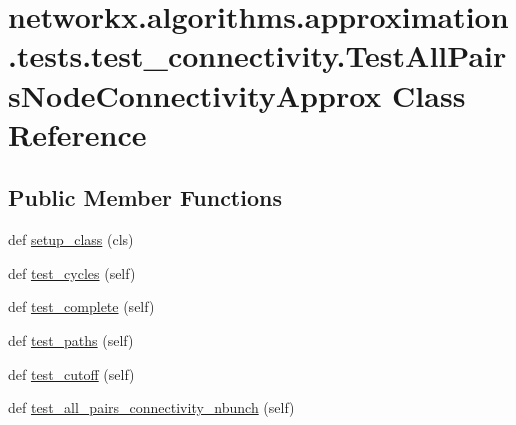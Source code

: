 \hypertarget{classnetworkx_1_1algorithms_1_1approximation_1_1tests_1_1test__connectivity_1_1TestAllPairsNodeConnectivityApprox}{}\section{networkx.\+algorithms.\+approximation.\+tests.\+test\+\_\+connectivity.\+Test\+All\+Pairs\+Node\+Connectivity\+Approx Class Reference}
\label{classnetworkx_1_1algorithms_1_1approximation_1_1tests_1_1test__connectivity_1_1TestAllPairsNodeConnectivityApprox}
\subsection*{Public Member Functions}
\begin{DoxyCompactItemize}
\item 
def \hyperlink{classnetworkx_1_1algorithms_1_1approximation_1_1tests_1_1test__connectivity_1_1TestAllPairsNodeConnectivityApprox_a19a976312e71b914aedfa84754f74647}{setup\+\_\+class} (cls)
\item 
def \hyperlink{classnetworkx_1_1algorithms_1_1approximation_1_1tests_1_1test__connectivity_1_1TestAllPairsNodeConnectivityApprox_adb8f17e2e9781f2983145d578acee489}{test\+\_\+cycles} (self)
\item 
def \hyperlink{classnetworkx_1_1algorithms_1_1approximation_1_1tests_1_1test__connectivity_1_1TestAllPairsNodeConnectivityApprox_a4da06b323ab1827c24599e9d976047fc}{test\+\_\+complete} (self)
\item 
def \hyperlink{classnetworkx_1_1algorithms_1_1approximation_1_1tests_1_1test__connectivity_1_1TestAllPairsNodeConnectivityApprox_a5d5670557ac40c765c18633f6660d9f7}{test\+\_\+paths} (self)
\item 
def \hyperlink{classnetworkx_1_1algorithms_1_1approximation_1_1tests_1_1test__connectivity_1_1TestAllPairsNodeConnectivityApprox_a86a4ae926fb9330b59f62777d128e152}{test\+\_\+cutoff} (self)
\item 
def \hyperlink{classnetworkx_1_1algorithms_1_1approximation_1_1tests_1_1test__connectivity_1_1TestAllPairsNodeConnectivityApprox_ab77804b57c7f1f7ce7e62457cd39a11b}{test\+\_\+all\+\_\+pairs\+\_\+connectivity\+\_\+nbunch} (self)
\end{DoxyCompactItemize}
